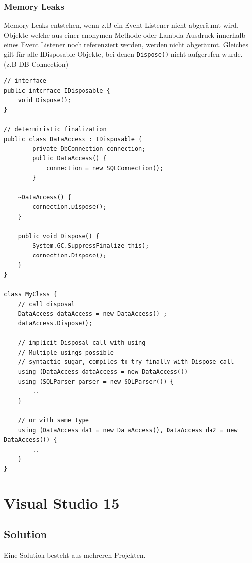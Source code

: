 \documentclass[
a4paper,
oneside,
10pt,
fleqn,
headsepline,
toc=listofnumbered, 
bibliography=totocnumbered]{scrartcl}
\let\stdsection\section
\renewcommand\section{\clearpage\stdsection}
\begin{document}
\subsubsection{Memory Leaks} Memory Leaks entstehen, wenn z.B ein Event Listener nicht abgeräumt wird. Objekte welche aus einer anonymen Methode oder Lambda Ausdruck innerhalb eines Event Listener noch referenziert werden, werden nicht abgeräumt. Gleiches gilt für alle IDisposable Objekte, bei denen \lstinline|Dispose()| nicht aufgerufen wurde. (z.B DB Connection)

\begin{lstlisting}
// interface
public interface IDisposable {
	void Dispose();
}
	
// deterministic finalization
public class DataAccess : IDisposable {
		private DbConnection connection;
		public DataAccess() {
			connection = new SQLConnection();
		}
	
	~DataAccess() {
		connection.Dispose();
	}
	
	public void Dispose() {
		System.GC.SuppressFinalize(this);
		connection.Dispose();
	}
}

class MyClass {
	// call disposal
	DataAccess dataAccess = new DataAccess() ;
	dataAccess.Dispose();
	
	// implicit Disposal call with using
	// Multiple usings possible
	// syntactic sugar, compiles to try-finally with Dispose call
	using (DataAccess dataAccess = new DataAccess())
	using (SQLParser parser = new SQLParser()) {
		..
	}
	
	// or with same type
	using (DataAccess da1 = new DataAccess(), DataAccess da2 = new DataAccess()) {
		..
	}
}
\end{lstlisting}

\section{Visual Studio 15}
\subsection{Solution}
Eine Solution besteht aus mehreren Projekten.
\end{document}
